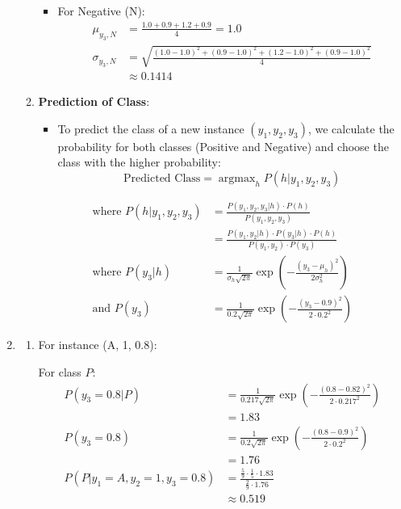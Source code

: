 \documentclass{article}
\DeclareMathOperator*{\argmax}{argmax}
\begin{document}
\begin{enumerate}[leftmargin=\labelsep]
\begin{enumerate}
\begin{itemize}
        \item For Negative (N):
        \begin{align*}
            \mu_{y_3,N} &= \frac{1.0 + 0.9 + 1.2 + 0.9}{4} = 1.0 \\
            \sigma_{y_3,N} &= \sqrt{\frac{(1.0 - 1.0)^2 + (0.9 - 1.0)^2 + (1.2 - 1.0)^2 + (0.9 - 1.0)^2}{4}} \\
                          &\approx 0.1414
        \end{align*}

    \end{itemize}

    \item \textbf{Prediction of Class}:
    \begin{itemize}
        \item To predict the class of a new instance \((y_1, y_2, y_3)\), we calculate the probability for both classes (Positive and Negative) and choose the class with the higher probability:
        \[
        \text{Predicted Class} = \argmax_h P(h | y_1, y_2, y_3)
        \]
    \end{itemize}
    
    \begin{align*}
    \text{where } P(h | y_1, y_2, y_3) &= \frac{P(y_1, y_2, y_3 | h) \cdot P(h)}{P(y_1, y_2, y_3)} \\[10pt]
    &= \frac{P(y_1, y_2 | h) \cdot P(y_3 | h) \cdot P(h)}{P(y_1, y_2) \cdot P(y_3)} \\[10pt]
    \text{where } P(y_3 | h) &= \frac{1}{\sigma_h \sqrt{2\pi}} \exp\left(-\frac{(y_3 - \mu_h)^2}{2\sigma_h^2}\right) \\[10pt]
    \text{and } P(y_3) &= \frac{1}{0.2 \sqrt{2\pi}} \exp\left(-\frac{(y_3 - 0.9)^2}{2 \cdot 0.2^2}\right)
    \end{align*}

\end{enumerate}

\item \begin{enumerate} 
    \item For instance (A, 1, 0.8):


    For class \( P \):
    \begin{align*}
    P(y_3=0.8 | P) &= \frac{1}{0.217 \sqrt{2\pi}} \exp\left(-\frac{(0.8 - 0.82)^2}{2 \cdot 0.217^2}\right) \\[10pt]
    &= 1.83\\
    P(y_3=0.8) &= \frac{1}{0.2 \sqrt{2\pi}} \exp\left(-\frac{(0.8 - 0.9)^2}{2 \cdot 0.2^2}\right) \\[10pt]
    &= 1.76\\
    P(P | y_1=A, y_2=1, y_3=0.8) &= \frac{\frac{5}{9} \cdot \frac{1}{5} \cdot 1.83}{\frac{2}{9} \cdot 1.76} \\[10pt]
    &\approx 0.519
    \end{align*}


\end{enumerate}
\end{enumerate}
\end{document}
